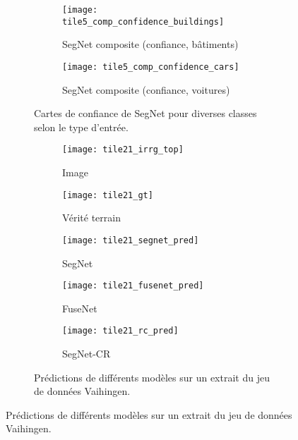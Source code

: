 \begin{figure}[hb]
\begin{subfigure}{\textwidth}
\begin{subfigure}[t]{0.19\textwidth}
        \end{subfigure}
        \begin{subfigure}[t]{0.19\textwidth}
        	\texttt{[image: tile5\_comp\_confidence\_buildings]}
        	\caption*{SegNet composite (confiance, bâtiments)}
        \end{subfigure}
        \begin{subfigure}[t]{0.19\textwidth}
        	\texttt{[image: tile5\_comp\_confidence\_cars]}
        	\caption*{SegNet composite (confiance, voitures)}
        \end{subfigure}
        \caption{Cartes de confiance de SegNet pour diverses classes selon le type d'entrée.}
        \label{fig:confidence_vaihingen_fusion}
    \end{subfigure}
    \begin{subfigure}{\textwidth}
    	\captionsetup[subfigure]{singlelinecheck=off,justification=centering}
  		\captionsetup[subfigure]{labelformat=empty}
    	\begin{subfigure}{0.19\textwidth}
        	\texttt{[image: tile21\_irrg\_top]}
      		\caption*{Image }
        \end{subfigure}
        \begin{subfigure}{0.19\textwidth}
        	\texttt{[image: tile21\_gt]}
        	\caption*{Vérité terrain}
        \end{subfigure}
        \begin{subfigure}{0.19\textwidth}
        	\texttt{[image: tile21\_segnet\_pred]}
        	\caption*{SegNet}
        \end{subfigure}
        \begin{subfigure}{0.19\textwidth}
        	\texttt{[image: tile21\_fusenet\_pred]}
        	\caption*{FuseNet}
        \end{subfigure}
        \begin{subfigure}{0.19\textwidth}
        	\texttt{[image: tile21\_rc\_pred]}
        	\caption*{SegNet-CR}
        \end{subfigure}
        \caption{Prédictions de différents modèles sur un extrait du jeu de données  Vaihingen.}
        \label{fig:fusion_exemple2}
    \end{subfigure}

   	\label{fig:fusion_success}
\end{figure}

